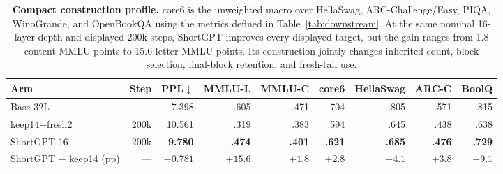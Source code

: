 \begin{table}[t]
\centering
\scriptsize
\setlength{\tabcolsep}{4.0pt}
\begin{tabular}{@{}lrrrrrrrr@{}}
\toprule
\textbf{Arm} & \textbf{Step} & \textbf{PPL}$\downarrow$ &
\textbf{MMLU-L} & \textbf{MMLU-C} & \textbf{core6} &
\textbf{HellaSwag} & \textbf{ARC-C} & \textbf{BoolQ} \\
\midrule
Base 32L & --- & 7.398 & .605 & .471 & .704 & .805 & .571 & .815 \\
keep14+fresh2 & 200k & 10.561 & .319 & .383 & .594 & .645 & .438 & .638 \\
ShortGPT-16 & 200k & \textbf{9.780} & \textbf{.474} & \textbf{.401} &
\textbf{.621} & \textbf{.685} & \textbf{.476} & \textbf{.729} \\
\midrule
ShortGPT $-$ keep14 (pp) & --- & $-0.781$ & $+15.6$ & $+1.8$ &
$+2.8$ & $+4.1$ & $+3.8$ & $+9.1$ \\
\bottomrule
\end{tabular}
\caption{\textbf{Compact construction profile.} core6 is the unweighted macro
over HellaSwag, ARC-Challenge/Easy, PIQA, WinoGrande, and OpenBookQA using the
metrics defined in Table~\ref{tab:downstream}. At the same nominal
16-layer depth and displayed 200k steps, ShortGPT improves every displayed
target, but the gain ranges from 1.8 content-MMLU points to 15.6 letter-MMLU
points. Its construction jointly changes inherited count, block selection,
final-block retention, and fresh-tail use.}
\label{tab:policy-endpoint}
\end{table}
